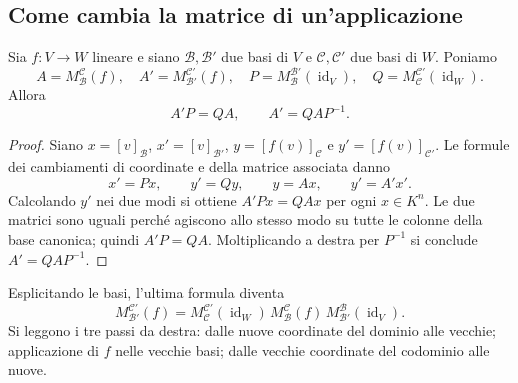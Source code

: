 \subsection{Come cambia la matrice di un'applicazione}
\begin{teorema}
Sia $f:V\to W$ lineare e siano $\mathcal B,\mathcal B'$ due basi di $V$ e $\mathcal C,\mathcal C'$ due basi di $W$. Poniamo
\[
 A=M_{\mathcal B}^{\mathcal C}(f),\quad
 A'=M_{\mathcal B'}^{\mathcal C'}(f),\quad
 P=M_{\mathcal B}^{\mathcal B'}(\operatorname{id}_V),\quad
 Q=M_{\mathcal C}^{\mathcal C'}(\operatorname{id}_W).
\]
Allora
\[
 A'P=QA,\qquad A'=QAP^{-1}.
\]
\end{teorema}
\begin{proof}
Siano $x=[v]_{\mathcal B}$, $x'=[v]_{\mathcal B'}$, $y=[f(v)]_{\mathcal C}$ e $y'=[f(v)]_{\mathcal C'}$. Le formule dei cambiamenti di coordinate e della matrice associata danno
\[
 x'=Px,\qquad y'=Qy,\qquad y=Ax,\qquad y'=A'x'.
\]
Calcolando $y'$ nei due modi si ottiene $A'Px=QAx$ per ogni $x\in K^n$. Le due matrici sono uguali perché agiscono allo stesso modo su tutte le colonne della base canonica; quindi $A'P=QA$. Moltiplicando a destra per $P^{-1}$ si conclude $A'=QAP^{-1}$.
\end{proof}
Esplicitando le basi, l'ultima formula diventa
\[
 M_{\mathcal B'}^{\mathcal C'}(f)
 =M_{\mathcal C}^{\mathcal C'}(\operatorname{id}_W)\,
 M_{\mathcal B}^{\mathcal C}(f)\,
 M_{\mathcal B'}^{\mathcal B}(\operatorname{id}_V).
\]
Si leggono i tre passi da destra: dalle nuove coordinate del dominio alle vecchie; applicazione di $f$ nelle vecchie basi; dalle vecchie coordinate del codominio alle nuove.

